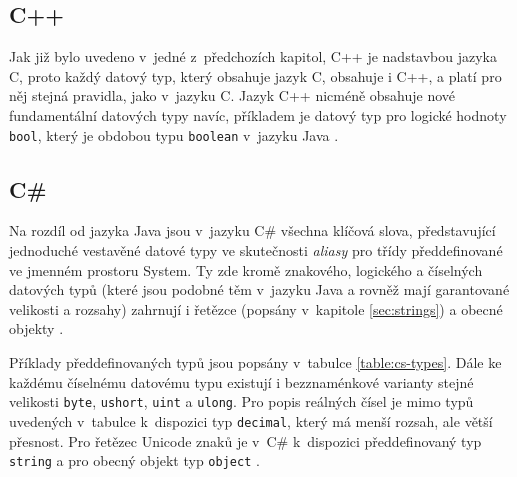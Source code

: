 \documentclass{bakalarka}
\begin{document}
\subsection{C++}
Jak již bylo uvedeno v~jedné z~předchozích kapitol, C++ je nadstavbou jazyka C, proto každý datový typ, který obsahuje jazyk C, obsahuje i C++, a platí pro něj stejná pravidla, jako v~jazyku C. Jazyk C++ nicméně obsahuje nové fundamentální datových typy navíc, příkladem je datový typ pro logické hodnoty \texttt{bool}, který je obdobou typu \texttt{boolean} v~jazyku Java \cite{cpp-book, cpp-guide-types}.\par

\subsection{C\#}
Na rozdíl od jazyka Java jsou v~jazyku C\# všechna klíčová slova, představující jednoduché vestavěné datové typy ve skutečnosti \textit{aliasy} pro třídy předdefinované ve jmenném prostoru System. Ty zde kromě znakového, logického a číselných datových typů (které jsou podobné těm v~jazyku Java a rovněž mají garantované velikosti a rozsahy) zahrnují i řetězce (popsány v~kapitole \ref{sec:strings}) a obecné objekty \cite{cs-book, cs-guide-types, cs-guide-sbyte, cs-guide-short, cs-guide-int, cs-guide-long, cs-guide-float, cs-guide-double, cs-guide-bool, cs-guide-char}.

Příklady předdefinovaných typů jsou popsány v~tabulce \ref{table:cs-types}. Dále ke každému číselnému datovému typu existují i bezznaménkové varianty stejné velikosti \texttt{byte}, \texttt{ushort}, \texttt{uint} a \texttt{ulong}. Pro popis reálných čísel je mimo typů uvedených v~tabulce k~dispozici typ \texttt{decimal}, který má menší rozsah, ale větší přesnost. Pro řetězec Unicode znaků je v~C\# k~dispozici předdefinovaný typ \texttt{string} a pro obecný objekt typ \texttt{object} \cite{cs-book, cs-guide-types, cs-guide-byte, cs-guide-ushort, cs-guide-uint, cs-guide-ulong, cs-guide-decimal, cs-guide-string, cs-guide-object}.
\end{document}
